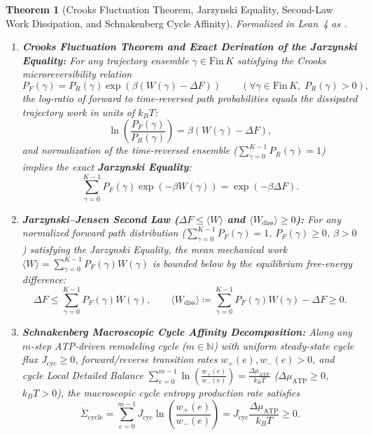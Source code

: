 \documentclass[11pt,a4paper]{article}
\newtheorem{theorem}{Theorem}[section]
\theoremstyle{definition}
\begin{document}
\begin{theorem}[Crooks Fluctuation Theorem, Jarzynski Equality, Second-Law Work Dissipation, and Schnakenberg Cycle Affinity]
\label{thm:jarzynski_crooks}
Formalized in Lean~4 as \texttt{}.
\begin{enumerate}
  \item \textbf{Crooks Fluctuation Theorem and Exact Derivation of the Jarzynski Equality:} For any trajectory ensemble $\gamma \in \mathrm{Fin}\,K$ satisfying the Crooks microreversibility relation
  \begin{equation}
    P_F(\gamma) = P_R(\gamma)\exp\!\left(\beta\left(W(\gamma) - \Delta F\right)\right) \qquad (\forall \gamma \in \mathrm{Fin}\,K,\; P_R(\gamma) > 0),
  \end{equation}
  the log-ratio of forward to time-reversed path probabilities equals the dissipated trajectory work in units of $k_B T$:
  \begin{equation}
    \ln\!\left(\frac{P_F(\gamma)}{P_R(\gamma)}\right) = \beta\left(W(\gamma) - \Delta F\right),
  \end{equation}
  and normalization of the time-reversed ensemble ($\sum_{\gamma=0}^{K-1} P_R(\gamma) = 1$) implies the exact \textbf{Jarzynski Equality}:
  \begin{equation}
    \sum_{\gamma=0}^{K-1} P_F(\gamma)\exp\!\left(-\beta W(\gamma)\right) = \exp\!\left(-\beta\Delta F\right).
  \end{equation}
  \item \textbf{Jarzynski--Jensen Second Law ($\Delta F \le \langle W\rangle$ and $\langle W_{\mathrm{diss}}\rangle \ge 0$):} For any normalized forward path distribution ($\sum_{\gamma=0}^{K-1} P_F(\gamma) = 1$, $P_F(\gamma) \ge 0$, $\beta > 0$) satisfying the Jarzynski Equality, the mean mechanical work $\langle W\rangle = \sum_{\gamma=0}^{K-1} P_F(\gamma) W(\gamma)$ is bounded below by the equilibrium free-energy difference:
  \begin{equation}
    \Delta F \le \sum_{\gamma=0}^{K-1} P_F(\gamma) W(\gamma), \qquad \langle W_{\mathrm{diss}}\rangle \coloneqq \sum_{\gamma=0}^{K-1} P_F(\gamma) W(\gamma) - \Delta F \ge 0.
  \end{equation}
  \item \textbf{Schnakenberg Macroscopic Cycle Affinity Decomposition:} Along any $m$-step ATP-driven remodeling cycle ($m \in \mathbb{N}$) with uniform steady-state cycle flux $J_{\mathrm{cyc}} \ge 0$, forward/reverse transition rates $w_+(e), w_-(e) > 0$, and cycle Local Detailed Balance $\sum_{e=0}^{m-1} \ln\!\left(\frac{w_+(e)}{w_-(e)}\right) = \frac{\Delta\mu_{\mathrm{ATP}}}{k_B T}$ ($\Delta\mu_{\mathrm{ATP}} \ge 0$, $k_B T > 0$), the macroscopic cycle entropy production rate satisfies
  \begin{equation}
    \dot{\Sigma}_{\mathrm{cycle}} = \sum_{e=0}^{m-1} J_{\mathrm{cyc}}\ln\!\left(\frac{w_+(e)}{w_-(e)}\right) = J_{\mathrm{cyc}}\frac{\Delta\mu_{\mathrm{ATP}}}{k_B T} \ge 0.
  \end{equation}
\end{enumerate}
\end{theorem}
\end{document}
